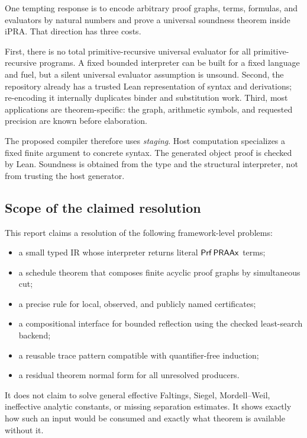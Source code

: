 One tempting response is to encode arbitrary proof graphs, terms, formulas, and evaluators by
natural numbers and prove a universal soundness theorem inside iPRA.  That direction has three costs.

First, there is no total primitive-recursive universal evaluator for all primitive-recursive
programs.  A fixed bounded interpreter can be built for a fixed language and fuel, but a silent
universal evaluator assumption is unsound.  Second, the repository already has a trusted Lean
representation of syntax and derivations; re-encoding it internally duplicates binder and
substitution work.  Third, most applications are theorem-specific: the graph, arithmetic symbols,
and requested precision are known before elaboration.

The proposed compiler therefore uses \emph{staging}.  Host computation specializes a fixed finite
argument to concrete syntax.  The generated object proof is checked by Lean.  Soundness is obtained
from the type and the structural interpreter, not from trusting the host generator.

\subsection{Scope of the claimed resolution}

This report claims a resolution of the following framework-level problems:

\begin{itemize}
\item a small typed IR whose interpreter returns literal \(\mathsf{Prf}\,\mathsf{PRAAx}\) terms;
\item a schedule theorem that composes finite acyclic proof graphs by simultaneous cut;
\item a precise rule for local, observed, and publicly named certificates;
\item a compositional interface for bounded reflection using the checked least-search backend;
\item a reusable trace pattern compatible with quantifier-free induction;
\item a residual theorem normal form for all unresolved producers.
\end{itemize}

It does not claim to solve general effective Faltings, Siegel, Mordell--Weil, ineffective analytic
constants, or missing separation estimates.  It shows exactly how such an input would be consumed
and exactly what theorem is available without it.
